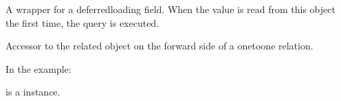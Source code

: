 \documentclass[letterpaper,10pt,polish]{sphinxmanual}
\begin{document}
\begin{fulllineitems}
\begin{fulllineitems}
\end{fulllineitems}


\begin{fulllineitems}
\label{\detokenize{mainApp:mainApp.models.UserProfile.id}}
\pysigstartsignatures
{}
\pysigstopsignatures
\sphinxAtStartPar
A wrapper for a deferred\sphinxhyphen{}loading field. When the value is read from this
object the first time, the query is executed.

\end{fulllineitems}


\begin{fulllineitems}
\label{\detokenize{mainApp:mainApp.models.UserProfile.objects}}
\pysigstartsignatures
{}
\pysigstopsignatures
\end{fulllineitems}


\begin{fulllineitems}
\label{\detokenize{mainApp:mainApp.models.UserProfile.totp_device}}
\pysigstartsignatures
{}
\pysigstopsignatures
\sphinxAtStartPar
Accessor to the related object on the forward side of a one\sphinxhyphen{}to\sphinxhyphen{}one relation.

\sphinxAtStartPar
In the example:

\begin{sphinxVerbatim}[commandchars=\\\{\}]
 
       
\end{sphinxVerbatim}

\sphinxAtStartPar
{} is a  instance.


\end{fulllineitems}
\end{fulllineitems}
\end{document}
